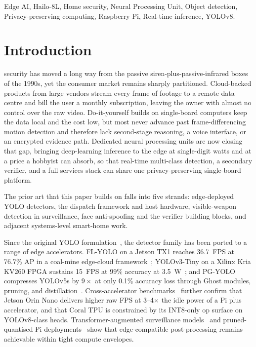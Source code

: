 \documentclass{ieeeaccess}
\begin{document}
\begin{keywords}
Edge AI, Hailo-8L, Home security, Neural Processing Unit, Object detection, Privacy-preserving computing, Raspberry Pi, Real-time inference, YOLOv8.
\end{keywords}

\titlepgskip=-21pt

\maketitle

\section{Introduction}
\label{sec:introduction}
 security has moved a long way from the passive siren-plus-passive-infrared boxes of the 1990s, yet the consumer market remains sharply partitioned. Cloud-backed products from large vendors stream every frame of footage to a remote data centre and bill the user a monthly subscription, leaving the owner with almost no control over the raw video. Do-it-yourself builds on single-board computers keep the data local and the cost low, but most never advance past frame-differencing motion detection and therefore lack second-stage reasoning, a voice interface, or an encrypted evidence path. Dedicated neural processing units are now closing that gap, bringing deep-learning inference to the edge at single-digit watts and at a price a hobbyist can absorb, so that real-time multi-class detection, a secondary verifier, and a full services stack can share one privacy-preserving single-board platform.

The prior art that this paper builds on falls into five strands: edge-deployed YOLO detectors, the dispatch framework and host hardware, visible-weapon detection in surveillance, face anti-spoofing and the verifier building blocks, and adjacent systems-level smart-home work.

Since the original YOLO formulation~\cite{b2}, the detector family has been ported to a range of edge accelerators. FL-YOLO on a Jetson TX1 reaches 36.7~FPS at 76.7\% AP in a coal-mine edge-cloud framework~\cite{b1}; YOLOv3-Tiny on a Xilinx Kria KV260 FPGA sustains 15~FPS at 99\% accuracy at 3.5~W~\cite{b5}; and PG-YOLO compresses YOLOv5s by $9\times$ at only 0.1\% accuracy loss through Ghost modules, pruning, and distillation~\cite{b6}. Cross-accelerator benchmarks~\cite{b25,b26} further confirm that Jetson Orin Nano delivers higher raw FPS at 3--4$\times$ the idle power of a Pi plus accelerator, and that Coral TPU is constrained by its INT8-only op surface on YOLOv8-class heads. Transformer-augmented surveillance models~\cite{b27} and pruned-quantised Pi deployments~\cite{b29} show that edge-compatible post-processing remains achievable within tight compute envelopes.
\end{document}
